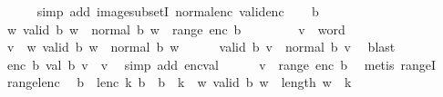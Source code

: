 \begin{isabellebody}
\ \ \ \ \isamarkupfalse%
\ {\isacharparenleft}{\kern0pt}simp\ add{\isacharcolon}{\kern0pt}\ image{\isacharunderscore}{\kern0pt}subsetI\ normal{\isacharunderscore}{\kern0pt}enc\ valid{\isacharunderscore}{\kern0pt}enc{\isacharparenright}{\kern0pt}\isanewline
{}\isamarkupfalse%
\isanewline
\ \ \isamarkupfalse%
\ {\isachardoublequoteopen}{}{\isasymle}b{\isachardoublequoteclose}\isanewline
\ \ \isamarkupfalse%
\ {\isachardoublequoteopen}{\isacharbraceleft}{\kern0pt}w{\isachardot}{\kern0pt}\ valid\ b\ w\ {\isasymand}\ normal\ b\ w{\isacharbraceright}{\kern0pt}\ {\isasymsubseteq}\ range\ {\isacharparenleft}{\kern0pt}enc\ b{\isacharparenright}{\kern0pt}{\isachardoublequoteclose}\isanewline
\ \ \isamarkupfalse%
\isanewline
\ \ \ \ \isamarkupfalse%
\ v\ {\isacharcolon}{\kern0pt}{\isacharcolon}{\kern0pt}\ word\isanewline
\ \ \ \ \isamarkupfalse%
\ {\isachardoublequoteopen}v\ {\isasymin}\ {\isacharbraceleft}{\kern0pt}w{\isachardot}{\kern0pt}\ valid\ b\ w\ {\isasymand}\ normal\ b\ w{\isacharbraceright}{\kern0pt}{\isachardoublequoteclose}\isanewline
\ \ \ \ \isamarkupfalse%
\ {\isachardoublequoteopen}valid\ b\ v\ {\isasymand}\ normal\ b\ v{\isachardoublequoteclose}\ \isamarkupfalse%
\ blast\isanewline
\ \ \ \ \isamarkupfalse%
\ {\isachardoublequoteopen}enc\ b\ {\isacharparenleft}{\kern0pt}val\ b\ v{\isacharparenright}{\kern0pt}\ {\isacharequal}{\kern0pt}\ v{\isachardoublequoteclose}\ \isamarkupfalse%
\ {\isacharparenleft}{\kern0pt}simp\ add{\isacharcolon}{\kern0pt}\ enc{\isacharunderscore}{\kern0pt}val{\isacharparenright}{\kern0pt}\isanewline
\ \ \ \ \isamarkupfalse%
\ {\isachardoublequoteopen}v\ {\isasymin}\ range\ {\isacharparenleft}{\kern0pt}enc\ b{\isacharparenright}{\kern0pt}{\isachardoublequoteclose}\ \isamarkupfalse%
\ {\isacharparenleft}{\kern0pt}metis\ rangeI{\isacharparenright}{\kern0pt}\isanewline
\ \ \isamarkupfalse%
\isanewline
{}\isamarkupfalse%
%
\endisatagproof
{\isafoldproof}%
%
\isadelimproof
\isanewline
%
\endisadelimproof
\isanewline
{}\isamarkupfalse%
\ range{\isacharunderscore}{\kern0pt}lenc{\isacharcolon}{\kern0pt}\isanewline
\ \ {\isachardoublequoteopen}{}{\isasymle}b\ {\isasymLongrightarrow}\ lenc\ k\ b\ {\isacharbackquote}{\kern0pt}\ {\isacharbraceleft}{\kern0pt}{\isachardot}{\kern0pt}{\isachardot}{\kern0pt}{\isacharless}{\kern0pt}b\ {\isacharcircum}{\kern0pt}\ k{\isacharbraceright}{\kern0pt}\ {\isacharequal}{\kern0pt}\ {\isacharbraceleft}{\kern0pt}w{\isachardot}{\kern0pt}\ valid\ b\ w\ {\isasymand}\ length\ w\ {\isacharequal}{\kern0pt}\ k{\isacharbraceright}{\kern0pt}{\isachardoublequoteclose}\isanewline

\end{isabellebody}
